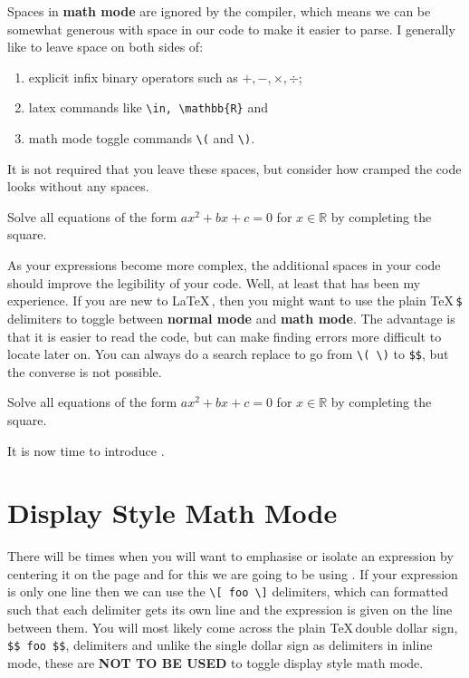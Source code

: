 Spaces in \textbf{math mode} are ignored by the compiler, which means we can
be somewhat generous with space in our code to make it easier to parse.  I
generally like to leave space on both sides of:
\begin{enumerate}
\item explicit infix binary operators such as \( +, - , \times, \div \);
  \item latex commands like \verb!\in, \mathbb{R}! and
  \item math mode toggle commands \verb!\(! and \verb!\)!.
\end{enumerate}
It is not required that you leave these spaces, but consider how cramped the
code looks without any spaces.
\begin{mhotexbox}
Solve all equations of the form \(ax^2+bx+c=0\) for
\(x\in\mathbb{R}\) by completing the square.
\end{mhotexbox}
As your expressions become more complex, the additional spaces in your code
should improve the legibility of your code.  Well, at least that has been my
experience. If you are new to \LaTeX\,, then you might want to use the
plain \TeX\,\verb!$! delimiters to toggle between \textbf{normal mode} and
\textbf{math mode}.  The advantage is that it is easier to read the code, but
can make finding errors more difficult to locate later on.  You can always
do a search replace to go from \verb!\( \)! to \verb!$$!, but the converse
is not possible.
\begin{mhotexbox}
Solve all equations of the form $ ax^2 + bx + c = 0 $ for $ x \in \mathbb{R} $
by completing the square.
\end{mhotexbox}
It is now time to introduce .

\section{Display Style Math Mode}

There will be times when you will want to emphasise or isolate an expression
by centering it on the page and for this we are going to be using 
.  If your expression is only one line then
we can use the \verb!\[ foo \]! delimiters, which can formatted such that
each delimiter gets its own line and the expression is given on the line 
between them.  You will most likely come across the plain \TeX\,double
dollar sign, \verb!$$ foo $$!, delimiters and unlike the single dollar sign
as delimiters in inline mode, these are \textbf{NOT TO BE USED} to toggle
display style math mode.

